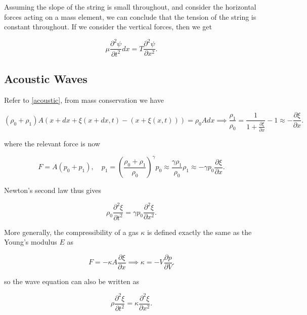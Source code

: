 \documentclass[a4paper,12pt]{report}
\begin{document}
Assuming the slope of the string is small throughout, and consider the horizontal forces acting on a mass element, we can conclude that the tension of the string is constant throughout. If we consider the vertical forces, then we get

\begin{equation}
    \mu \frac{\partial ^2\psi }{\partial t^2}dx = T \frac{\partial ^2\psi }{\partial x^2}.   
\end{equation}

\subsection{Acoustic Waves}

Refer to \cref{acoustic}, from mass conservation we have

\begin{equation}
	(\rho _{0}+\rho _{1}  ) A (x+dx+\xi (x+dx,t) - (x+\xi (x,t))) = \rho _{0}Adx \implies \frac{\rho _{1} }{\rho _{0} } = \frac{1}{1+\frac{\partial \xi }{\partial x} }-1 \approx - \frac{\partial \xi }{\partial x}.    
\end{equation}

where the relevant force is now 

\begin{equation}
	F = A(p_0 + p_1 ), \quad p_1 = \left(\frac{\rho _{0} + \rho _{1}  }{\rho _{0} }\right)^{\gamma } p_0 \approx \frac{\gamma \rho _{1} }{\rho _{0} }\rho _{1} \approx - \gamma p_0 \frac{\partial \xi }{\partial x}.
\end{equation}

Newton's second law thus gives 

\begin{equation}
	\rho _{0} \frac{\partial^2 \xi }{\partial t^2} = \gamma p_0 \frac{\partial^2 \xi }{\partial x^2}. 
\end{equation}

More generally, the compressibility of a gas \(\kappa \) is defined exactly the same as the Young's modulus \(E\) as

\begin{equation}
	F = -\kappa A \frac{\partial \xi }{\partial x} \implies \kappa = -V \frac{\partial p}{\partial V}.  
\end{equation}

so the wave equation can also be written as 

\begin{equation}
	\rho \frac{\partial^2 \xi }{\partial t^2} = \kappa \frac{\partial^2 \xi }{\partial x^2}.  
\end{equation}
\end{document}
